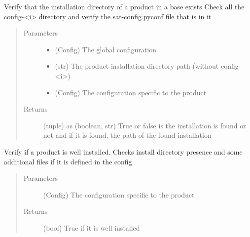\documentclass[a4paper,10pt,english]{sphinxmanual}
\begin{document}
\begin{fulllineitems}
\label{\detokenize{apidoc_src/src:src.product.check_config_exists}}
Verify that the installation directory of a product in a base exists
Check all the config-\textless{}i\textgreater{} directory and verify the sat-config.pyconf file
that is in it
\begin{quote}\begin{description}
\item[{Parameters}] \leavevmode\begin{itemize}
\item {} 
 \textendash{} (Config) The global configuration

\item {} 
 \textendash{} (str) 
The product installation directory path 
(without config-\textless{}i\textgreater{})

\item {} 
 \textendash{} (Config)
The configuration specific to the product

\end{itemize}

\item[{Returns}] \leavevmode
(tuple) as (boolean, str)
True or false is the installation is found or not 
and if it is found, the path of the found installation

\end{description}\end{quote}

\end{fulllineitems}


\begin{fulllineitems}
\label{\detokenize{apidoc_src/src:src.product.check_installation}}
Verify if a product is well installed. 
Checks install directory presence
and some additional files if it is defined in the config
\begin{quote}\begin{description}
\item[{Parameters}] \leavevmode
{} \textendash{} (Config) 
The configuration specific to the product

\item[{Returns}] \leavevmode
(bool) True if it is well installed

\end{description}\end{quote}

\end{fulllineitems}
\end{document}
